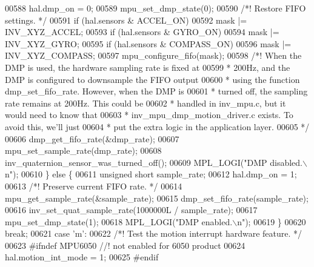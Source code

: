 \begin{DoxyCode}
{{{{{{{{00588             hal.dmp_on = 0;
00589             mpu\_set\_dmp\_state(0);
00590             \textcolor{comment}{/*! Restore FIFO settings. */}
00591             \textcolor{keywordflow}{if} (hal.sensors & ACCEL_ON)
00592                 mask |= INV\_XYZ\_ACCEL;
00593             \textcolor{keywordflow}{if} (hal.sensors & GYRO_ON)
00594                 mask |= INV\_XYZ\_GYRO;
00595             \textcolor{keywordflow}{if} (hal.sensors & COMPASS_ON)
00596                 mask |= INV\_XYZ\_COMPASS;
00597             mpu\_configure\_fifo(mask);
00598             \textcolor{comment}{/*! When the DMP is used, the hardware sampling rate is fixed at}
00599 \textcolor{comment}{             * 200Hz, and the DMP is configured to downsample the FIFO output}
00600 \textcolor{comment}{             * using the function dmp\_set\_fifo\_rate. However, when the DMP is}
00601 \textcolor{comment}{             * turned off, the sampling rate remains at 200Hz. This could be}
00602 \textcolor{comment}{             * handled in inv\_mpu.c, but it would need to know that}
00603 \textcolor{comment}{             * inv\_mpu\_dmp\_motion\_driver.c exists. To avoid this, we'll just}
00604 \textcolor{comment}{             * put the extra logic in the application layer.}
00605 \textcolor{comment}{             */}
00606             dmp\_get\_fifo\_rate(&dmp\_rate);
00607             mpu\_set\_sample\_rate(dmp\_rate);
00608             inv\_quaternion\_sensor\_was\_turned\_off();
00609             MPL\_LOGI(\textcolor{stringliteral}{"DMP disabled.\(\backslash\)n"});
00610         \} \textcolor{keywordflow}{else} \{
00611             \textcolor{keywordtype}{unsigned} \textcolor{keywordtype}{short} sample\_rate;
00612             hal.dmp_on = 1;
00613             \textcolor{comment}{/*! Preserve current FIFO rate. */}
00614             mpu\_get\_sample\_rate(&sample\_rate);
00615             dmp\_set\_fifo\_rate(sample\_rate);
00616             inv\_set\_quat\_sample\_rate(1000000L / sample\_rate);
00617             mpu\_set\_dmp\_state(1);
00618             MPL\_LOGI(\textcolor{stringliteral}{"DMP enabled.\(\backslash\)n"});
00619         \}
00620         \textcolor{keywordflow}{break};
00621     \textcolor{keywordflow}{case} \textcolor{stringliteral}{'m'}:
00622         \textcolor{comment}{/*! Test the motion interrupt hardware feature. */}
00623     \textcolor{preprocessor}{#}\textcolor{preprocessor}{ifndef} \textcolor{preprocessor}{MPU6050} \textcolor{comment}{//! not enabled for 6050 product}
00624     hal.motion_int_mode = 1;
00625     \textcolor{preprocessor}{#}\textcolor{preprocessor}{endif}
}}}}}}}}
\end{DoxyCode}
